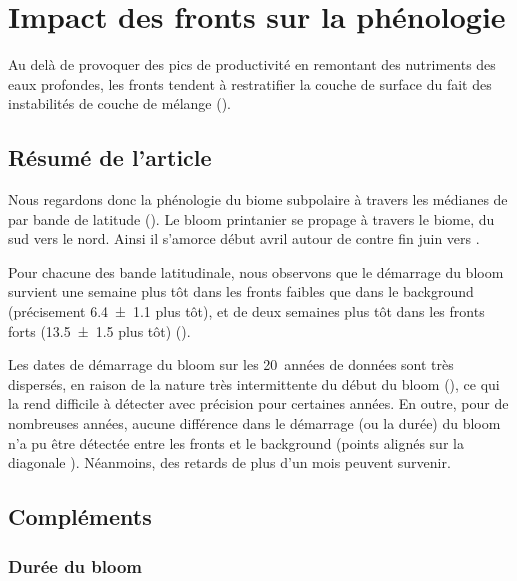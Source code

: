 
\chapter{Impact des fronts sur la phénologie}
\addChpLof
\label{chp:res-phenologie}
\graphicspath{{resources/res_phénologie}}

{
  \hypersetup{hidelinks}
  \minitoc%
  \clearpage
}

Au delà de provoquer des pics de productivité en remontant des nutriments des eaux profondes, les fronts tendent à restratifier la couche de surface du fait des instabilités de couche de mélange ().

\section{Résumé de l'article}
\label{sec:resume-res-phenologie}

Nous regardons donc la phénologie du biome subpolaire à travers les médianes de  par bande de latitude ().
Le bloom printanier se propage à travers le biome, du sud vers le nord.
Ainsi il s'amorce début avril autour de  contre fin juin vers .

Pour chacune des bande latitudinale, nous observons que le démarrage du bloom survient une semaine plus tôt dans les fronts faibles que dans le background (précisement \qty{6.4 \pm 1.1}{\jours} plus tôt), et de deux semaines plus tôt dans les fronts forts (\qty{13.5 \pm 1.5}{\jours} plus tôt) ().

Les dates de démarrage du bloom sur les 20~années de données sont très dispersés, en raison de la nature très intermittente du début du bloom (\cite{keerthi_2021}), ce qui la rend difficile à détecter avec précision pour certaines années.
En outre, pour de nombreuses années, aucune différence dans le démarrage (ou la durée) du bloom n'a pu être détectée entre les fronts et le background (points alignés sur la diagonale ).
Néanmoins, des retards de plus d'un mois peuvent survenir.

\section{Compléments}
\label{sec:complements-phenologie}

\subsection{Durée du bloom}
\label{sec:duree-bloom}


